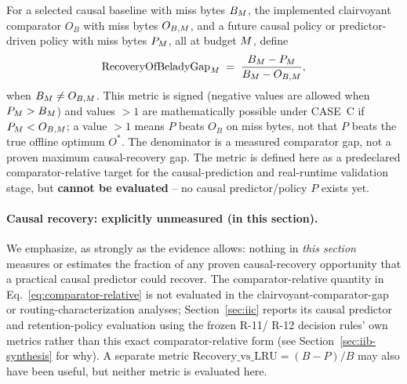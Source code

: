 \begin{definition}
\label{def:comparator-relative-metric}
For a selected causal baseline with miss bytes $B_M$, the implemented
clairvoyant comparator $O_B$ with miss bytes $O_{B,M}$, and a future
causal policy or predictor-driven policy with miss bytes $P_M$, all
at budget $M$, define
\begin{equation}
\mathrm{RecoveryOfBeladyGap}_M \;=\;
\frac{B_M - P_M}{B_M - O_{B,M}}, \label{eq:comparator-relative}
\end{equation}
when $B_M \ne O_{B,M}$. This metric is signed (negative values
are allowed when $P_M > B_M$) and values $>1$ are
mathematically possible under CASE~C if $P_M < O_{B,M}$; a
value $>1$ means $P$ beats $O_B$ on miss bytes, not that $P$ beats the true
offline optimum $O^*$. The denominator is a measured comparator gap, not a
proven maximum causal-recovery gap. The metric is defined here as a
predeclared comparator-relative target for the causal-prediction and
real-runtime validation stage, but
\textbf{cannot be evaluated} -- no causal predictor/policy $P$ exists yet.
\end{definition}

\paragraph{Causal recovery: explicitly unmeasured (in this section).} We
emphasize, as strongly as the evidence allows: nothing in \emph{this
section} measures or estimates the fraction of any proven causal-recovery
opportunity that a practical causal predictor could recover. The
comparator-relative quantity in Eq.~\eqref{eq:comparator-relative} is not evaluated in
the clairvoyant-comparator-gap or routing-characterization analyses;
Section~\ref{sec:iic} reports its
causal predictor and retention-policy evaluation using the frozen R-11/
R-12 decision rules' own metrics rather than this exact comparator-relative
form (see Section~\ref{sec:iib-synthesis} for why). A separate metric
$\mathrm{Recovery\_vs\_LRU} = (B-P)/B$ may also have been useful, but
neither metric is evaluated here.
